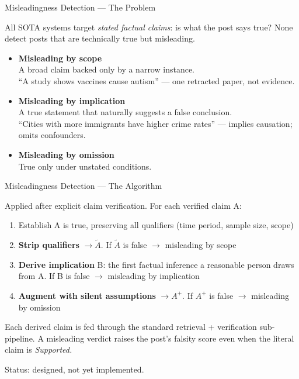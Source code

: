 \documentclass[11pt, aspectratio=169]{beamer}
\begin{document}
\begin{frame}{Misleadingness Detection — The Problem}

  All SOTA systems target \emph{stated factual claims}: is what the post says true?
  None detect posts that are \alert{technically true but misleading.}

  \bigskip
  \begin{itemize}\setlength{\itemsep}{14pt}
    \item \textbf{Misleading by scope}\\
          A broad claim backed only by a narrow instance.\\
          {\small ``A study shows vaccines cause autism'' — one retracted paper, not evidence.}
    \item \textbf{Misleading by implication}\\
          A true statement that naturally suggests a false conclusion.\\
          {\small ``Cities with more immigrants have higher crime rates'' — implies causation; omits confounders.}
    \item \textbf{Misleading by omission}\\
          True only under unstated conditions.
  \end{itemize}
\end{frame}

\begin{frame}{Misleadingness Detection — The Algorithm}

  Applied after explicit claim verification. For each verified claim A:

  \bigskip
  \begin{enumerate}\setlength{\itemsep}{12pt}
    \item Establish A is true, preserving all qualifiers (time period, sample size, scope)
    \item \textbf{Strip qualifiers} $\to \tilde{A}$.
          If $\tilde{A}$ is false $\to$ \alert{misleading by scope}
    \item \textbf{Derive implication} B: the first factual inference a reasonable person draws from A.
          If B is false $\to$ \alert{misleading by implication}
    \item \textbf{Augment with silent assumptions} $\to A^+$.
          If $A^+$ is false $\to$ \alert{misleading by omission}
  \end{enumerate}

  \bigskip
  {\small Each derived claim is fed through the standard retrieval + verification sub-pipeline.
  A misleading verdict raises the post's falsity score even when the literal claim is \emph{Supported.}}

  \smallskip
  {\small\textcolor{slate}{Status: designed, not yet implemented.}}
\end{frame}
\end{document}

